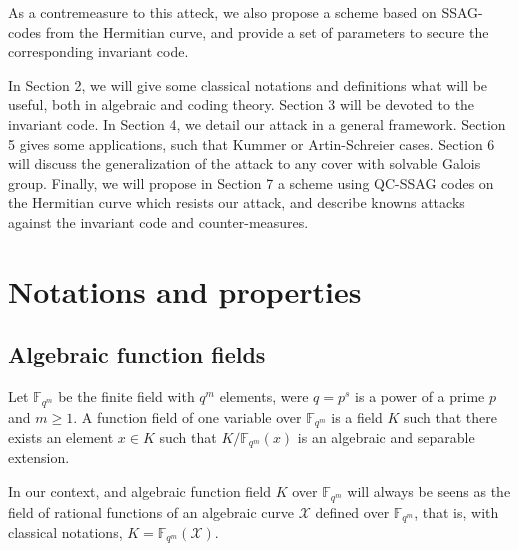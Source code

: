 \documentclass[10pt]{article}
\newcommand{\s}{\vspace{0.3cm}}
\newcommand{\fqm}{\mathbb{F}_{q^m}}
\newcommand{\X}{\mathcal{X}}
\begin{document}
\s

As a contremeasure to this atteck, we also propose a scheme based on SSAG-codes from the Hermitian curve, and provide a set of parameters to secure the corresponding invariant code.   

\s

In Section 2, we will give some classical notations and definitions what will be useful, both in algebraic and coding theory. Section 3 will be devoted to the invariant code. In Section 4, we detail our attack in a general framework. Section 5 gives some applications, such that Kummer or Artin-Schreier cases. Section 6 will discuss the generalization of the attack to any cover with solvable Galois group. Finally, we will propose in Section 7 a scheme using QC-SSAG codes on the Hermitian curve which resists our attack, and describe knowns attacks against the invariant code and counter-measures.


\s

\section{Notations and properties}

\s

\subsection{Algebraic function fields}

\s


Let $\fqm$ be the finite field with $q^m$ elements, were $q=p^s$ is a power of a prime $p$ and $m \geq 1$. A function field of one variable over $\fqm$ is a field $K$ such that there exists an element $x\in K$ such that $K/\fqm(x)$ is an algebraic and separable extension. 

In our context, and algebraic function field $K$ over $\fqm$ will always be seens as the field of rational functions of an algebraic curve $\X$ defined over $\fqm$, that is, with classical notations, $K = \fqm(\X)$.
\end{document}

